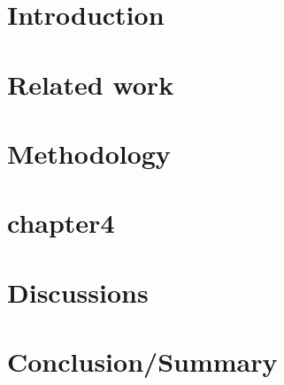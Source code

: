 \documentclass[MACS,english,a4paper,oneside]{ntnuthesis/ntnuthesis}
\begin{document}
	
	\makefrontpages %
	
	
	
	\tableofcontents
	
	\hypersetup{pageanchor=true}
	
	\listoffigures
	\listoftables
	
	
	\chapter{Introduction}
	 
	
	\chapter{Related work}
	 
	
	\chapter{Methodology}
	 
	
	\chapter{chapter4}
	 
	
	\chapter{Discussions}
	 
	
	\chapter{Conclusion/Summary}
	 
	
	
	
	
	
\end{document}
